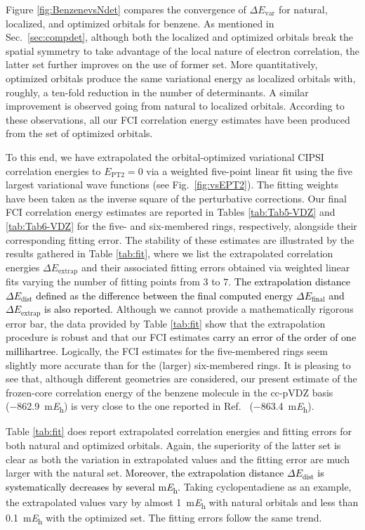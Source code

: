 \documentclass[aip,jcp,reprint,noshowkeys,superscriptaddress,floatfix]{revtex4-1}
\newcommand{\alert}[1]{\textcolor{black}{#1}}
\newcommand{\Evar}{E_\text{var}}
\newcommand{\Efinal}{E_\text{final}}
\newcommand{\Eextrap}{E_\text{extrap}}
\newcommand{\Edist}{E_\text{dist}}
\newcommand{\EPT}{E_\text{PT2}}
\begin{document}
Figure \ref{fig:BenzenevsNdet} compares the convergence of $\Delta \Evar$ for natural, localized, and optimized orbitals for benzene.
As mentioned in Sec.~\ref{sec:compdet}, although both the localized and optimized orbitals break the spatial symmetry to take advantage of the local nature of electron correlation, the latter set further improves on the use of former set.
More quantitatively, optimized orbitals produce the same variational energy as localized orbitals with, roughly, a ten-fold reduction in the number of determinants.
A similar improvement is observed going from natural to localized orbitals.
According to these observations, all our FCI correlation energy estimates have been produced from the set of optimized orbitals.

To this end, we have extrapolated the orbital-optimized variational CIPSI correlation energies to $\EPT = 0$ via a weighted five-point linear fit using the five largest variational wave functions (see Fig.~\ref{fig:vsEPT2}).
The fitting weights have been taken as the inverse square of the perturbative corrections.
Our final FCI correlation energy estimates are reported in Tables \ref{tab:Tab5-VDZ} and \ref{tab:Tab6-VDZ} for the five- and six-membered rings, respectively, alongside their corresponding fitting error.
The stability of these estimates are illustrated by the results gathered in Table \ref{tab:fit}, where we list the extrapolated correlation energies $\Delta \Eextrap$ and their associated fitting errors obtained via weighted linear fits varying the number of fitting points from $3$ to $7$.
\alert{The extrapolation distance $\Delta \Edist$ defined as the difference between the final computed energy $\Delta \Efinal$ and $\Delta \Eextrap$ is also reported.}
Although we cannot provide a mathematically rigorous error bar, the data provided by Table \ref{tab:fit} show that the extrapolation procedure is robust and that our FCI estimates \alert{carry an error of the order of one millihartree}.
Logically, the FCI estimates for the five-membered rings seem slightly more accurate than for the (larger) six-membered rings.
It is pleasing to see that, although different geometries are considered, our present estimate of the frozen-core correlation energy of the benzene molecule in the cc-pVDZ basis (\SI{-862.9}{\milli\hartree}) is very close to the one reported in Ref.~ (\SI{-863.4}{\milli\hartree}).

Table \ref{tab:fit} does report extrapolated correlation energies and fitting errors for both natural and optimized orbitals.
Again, the superiority of the latter set is clear as both the variation in extrapolated values and the fitting error are much larger with the natural set.
\alert{Moreover, the extrapolation distance $\Delta \Edist$ is systematically decreases by several \si{\milli\hartree}.}
Taking cyclopentadiene as an example, the extrapolated values vary by almost \SI{1}{\milli\hartree} with natural orbitals and less than \SI{0.1}{\milli\hartree} with the optimized set. 
The fitting errors follow the same trend.
\end{document}
